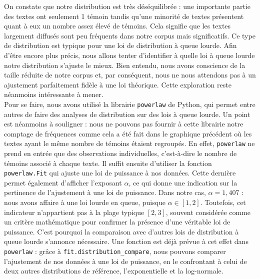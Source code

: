 \documentclass[a4paper,twoside,12pt]{book}
\begin{document}
On constate que notre distribution est très déséquilibrée : une importante partie des textes ont seulement 1 témoin tandis qu'une minorité de textes présentent quant à eux un nombre assez élevé de témoins. Cela signifie que les textes largement diffusés sont peu fréquents dans notre corpus mais significatifs. Ce type de distribution est typique pour une loi de distribution à queue lourde.
Afin d’être encore plus précis, nous allons tenter d’identifier à quelle loi à queue lourde notre distribution s’ajuste le mieux. Bien entendu, nous avons conscience de la taille réduite de notre corpus et, par conséquent, nous ne nous attendons pas à un ajustement parfaitement fidèle à une loi théorique. Cette exploration reste néanmoins intéressante à mener.\\
Pour se faire, nous avons utilisé la librairie \texttt{powerlaw} de Python, qui permet entre autres de faire des analyses de distribution sur des lois à queue lourde. Un point est néanmoins à souligner : nous ne pouvons pas fournir à cette librairie notre comptage de fréquences comme cela a été fait dans le graphique précédent où les textes ayant le même nombre de témoins étaient regroupés. En effet, \texttt{powerlaw} ne prend en entrée que des observations individuelles, c’est-à-dire le nombre de témoins associé à chaque texte.
Il suffit ensuite d’utiliser la fonction \texttt{powerlaw.Fit} qui ajuste une loi de puissance à nos données. Cette dernière permet également d’afficher l’exposant \(\alpha\), ce qui donne une indication sur la pertinence de l’ajustement à une loi de puissance. Dans notre cas, \(\alpha = 1{,}407\) : nous avons affaire à une loi lourde en queue, puisque \(\alpha \in [1,2]\). Toutefois, cet indicateur n'appartient pas à la plage typique \([2,3]\), souvent considérée comme un critère mathématique pour confirmer la présence d’une véritable loi de puissance. C'est pourquoi la comparaison avec d'autres lois de distribution à queue lourde s'annonce nécessaire. Une fonction est déjà prévue à cet effet dans \texttt{powerlaw} : grâce à \texttt{fit.distribution\_compare}, nous pouvons comparer l’ajustement de nos données à une loi de puissance, en le confrontant à celui de deux autres distributions de référence, l’exponentielle et la log-normale.
\end{document}

